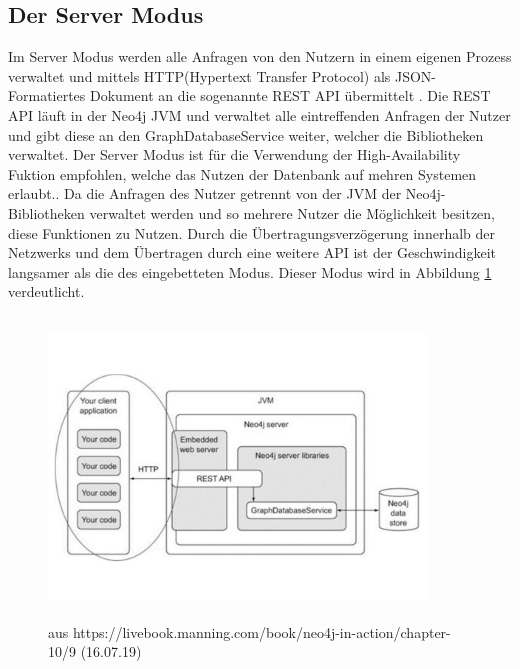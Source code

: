 \subsection{Der Server Modus}
Im Server Modus werden alle Anfragen von den Nutzern in einem eigenen Prozess verwaltet und mittels HTTP(Hypertext Transfer Protocol) als JSON-Formatiertes Dokument an die sogenannte REST API übermittelt \parencite{robinson2013graph}. Die REST API läuft in der Neo4j JVM und  verwaltet alle eintreffenden Anfragen der Nutzer und gibt diese an den GraphDatabaseService weiter, welcher die Bibliotheken verwaltet. \newline 
Der Server Modus ist für die Verwendung der High-Availability Fuktion empfohlen, welche das Nutzen der Datenbank auf mehren Systemen erlaubt.\parencite{raj2015neo4j}. Da die Anfragen des Nutzer getrennt von der JVM der Neo4j-Bibliotheken verwaltet werden und so mehrere Nutzer die Möglichkeit besitzen, diese Funktionen zu Nutzen. Durch die  Übertragungsverzögerung innerhalb der Netzwerks und dem Übertragen durch eine weitere API ist der Geschwindigkeit langsamer als die des eingebetteten Modus. Dieser Modus wird in Abbildung \ref{fig:Server} verdeutlicht.
\begin{figure}[!htb]
	\centering
	\includegraphics [width=10cm, height=8cm]{Figures/Server}
	\caption[Server]{aus https://livebook.manning.com/book/neo4j-in-action/chapter-10/9 (16.07.19)}
	\label{fig:Server}
\end{figure}

